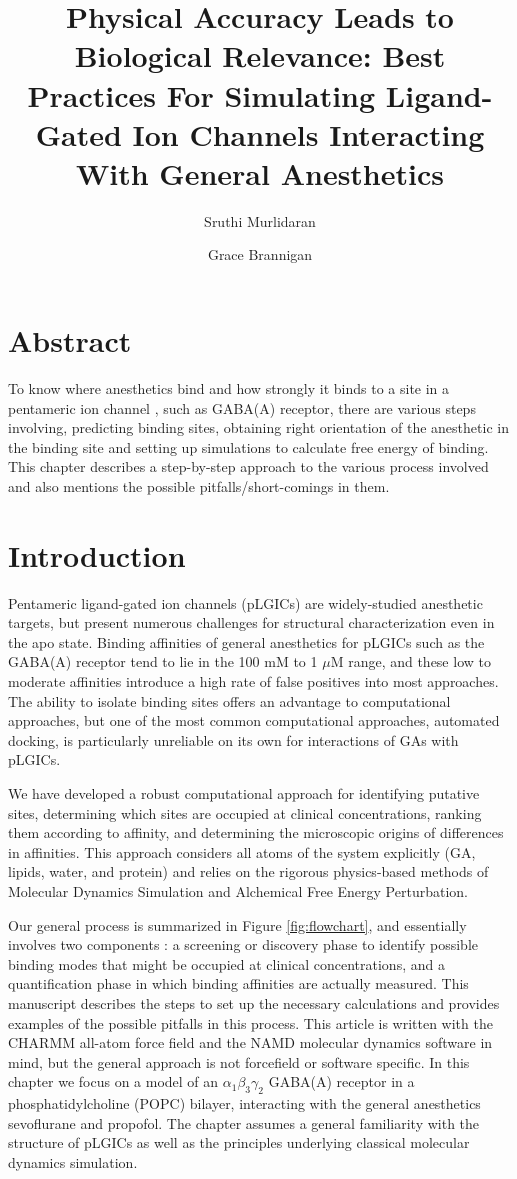 \documentclass[12pt]{article}
\title{{Physical Accuracy Leads to Biological Relevance: Best Practices For Simulating Ligand-Gated Ion Channels Interacting With General Anesthetics} }
\author[a,1]{Sruthi Murlidaran}
\author[a,b,2]{Grace Brannigan}
\affil[a]{Rutgers University, Center for Computational and Integrative Biology, Rutgers University, Camden, NJ, USA}
\affil[b]{Department of Physics, Rutgers University, Camden, NJ, USA}
\begin{document}
\maketitle




\section*{Abstract}
To know where anesthetics bind and how strongly it binds to a site in a pentameric ion channel , such as GABA(A) receptor, there are various steps involving, predicting binding sites, obtaining right orientation of the anesthetic in the binding site and setting up simulations to calculate free energy of binding. This chapter describes a step-by-step approach to the various process involved and also mentions the possible pitfalls/short-comings in them.


\section*{Introduction}

Pentameric ligand-gated ion channels (pLGICs) are widely-studied anesthetic targets, but present numerous challenges for structural characterization even in the apo state.  Binding affinities of general anesthetics for pLGICs such as the GABA(A) receptor tend to lie in the 100 mM to 1 $\mu$M range, and these low to moderate affinities introduce a high rate of false positives into most approaches.  The ability to isolate binding sites offers an advantage to computational approaches, but one of the most common computational approaches, automated docking, is particularly unreliable on its own for interactions of GAs with pLGICs.  

We have developed a robust computational approach for identifying putative sites, determining which sites are occupied at clinical concentrations, ranking them according to affinity, and determining the microscopic origins of differences in affinities. This approach considers all atoms of the system explicitly (GA, lipids, water, and protein) and relies on the rigorous physics-based methods of Molecular Dynamics Simulation and Alchemical Free Energy Perturbation. 

Our general process is summarized in Figure \ref{fig:flowchart}, and essentially involves two components : a screening or discovery phase to identify possible binding modes that might be occupied at clinical concentrations, and a quantification phase in which binding affinities are actually measured.  This manuscript describes the steps to set up the necessary calculations and provides examples of the possible pitfalls in this process.  This article is written with the CHARMM all-atom force field \cite{Brooks2009} and the NAMD molecular dynamics software \cite{Phillips2005a}in mind, but the general approach is not forcefield or software specific.  In this chapter we focus on a model of an $\alpha_1\beta_{3}\gamma_{2}$ GABA(A) receptor in a phosphatidylcholine (POPC) bilayer, interacting with the general anesthetics sevoflurane and propofol.  The chapter assumes a general familiarity with the structure of pLGICs as well as the principles underlying classical molecular dynamics simulation.  
\end{document}
